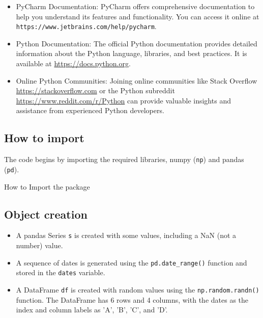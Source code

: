 		\begin{itemize}
			
			\item PyCharm Documentation: PyCharm offers comprehensive documentation to help you understand its features and functionality. You can access it online at \texttt{https://www.jetbrains.com/help/pycharm}.
			
			\item Python Documentation: The official Python documentation provides detailed information about the Python language, libraries, and best practices. It is available at \url{https://docs.python.org}.
			
			\item Online Python Communities: Joining online communities like Stack Overflow \url{https://stackoverflow.com} or the Python subreddit \url{https://www.reddit.com/r/Python} can provide valuable insights and assistance from experienced Python developers.
		
		\end{itemize}


	\subsection{How to import}
	The code begins by importing the required libraries, numpy (\texttt{np}) and pandas (\texttt{pd}).
	
		\begin{code}[h!]
		    
		
		\caption{How to Import the package}
		
		\end{code}
	
	\subsection{Object creation}

	\begin{itemize}
		\item A pandas Series \texttt{s} is created with some values, including a NaN (not a number) value.
		\item A sequence of dates is generated using the \texttt{pd.date\_range()} function and stored in the \texttt{dates} variable.
		\item A DataFrame \texttt{df} is created with random values using the \texttt{np.random.randn()} function. The DataFrame has 6 rows and 4 columns, with the dates as the index and column labels as 'A', 'B', 'C', and 'D'.
	\end{itemize}

